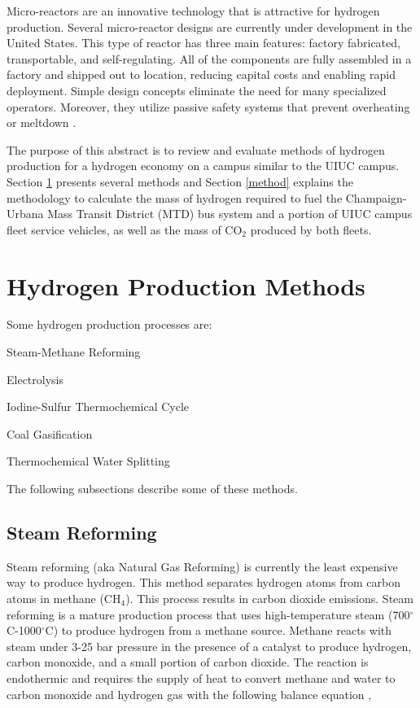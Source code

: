 \documentclass{anstrans}
\begin{document}
Micro-reactors are an innovative technology that is attractive for hydrogen production. Several micro-reactor designs are currently under development in the United States. This type of reactor has three main features: factory fabricated, transportable, and self-regulating. All of the components are fully assembled in a factory and shipped out to location, reducing capital costs and enabling rapid deployment. Simple design concepts eliminate the need for many specialized operators. Moreover, they utilize passive safety systems that prevent overheating or meltdown \cite{noauthor_ultimate_2019}.

The purpose of this abstract is to review and evaluate methods of hydrogen production for a hydrogen economy on a campus similar to the UIUC campus.
Section \ref{section:hydroprod} presents several methods and Section \ref{method} explains the methodology to calculate the mass of hydrogen required to fuel the Champaign-Urbana Mass Transit District (MTD) bus system and a portion of UIUC campus fleet service vehicles, as well as the mass of CO$_2$ produced by both fleets.

\section{Hydrogen Production Methods}
\label{section:hydroprod}

Some hydrogen production processes are: 
\begin{description}[font=$\bullet$\scshape\bfseries]
	\item[] Steam-Methane Reforming \cite{noauthor_hydrogen_nodate}
	\item[] Electrolysis \cite{noauthor_hydrogen_nodate}
	\item[] Iodine-Sulfur Thermochemical Cycle \cite{cea_gas-cooled_2006}
	\item[] Coal Gasification \cite{office_of_energy_efficiency_and_renewable_energy_coal_gas_2020}
	\item[] Thermochemical Water Splitting \cite{office_of_energy_efficiency_and_renewable_energy_thermo_water_2020}
\end{description}

The following subsections describe some of these methods.

\subsection{Steam Reforming}

Steam reforming (aka Natural Gas Reforming) is currently the least expensive way to produce hydrogen. This method separates hydrogen atoms from carbon atoms in methane (CH$_4$). This process results in carbon dioxide emissions.
Steam reforming is a mature production process that uses high-temperature steam (700$^{\circ}$C-1000$^{\circ}$C) to produce hydrogen from a methane source. Methane reacts with steam under 3-25 bar pressure in the presence of a catalyst to produce hydrogen, carbon monoxide, and a small portion of carbon dioxide. The reaction is endothermic and requires the supply of heat to convert methane and water to carbon monoxide and hydrogen gas with the following balance equation \cite{noauthor_hydrogen_nodate},
\end{document}
